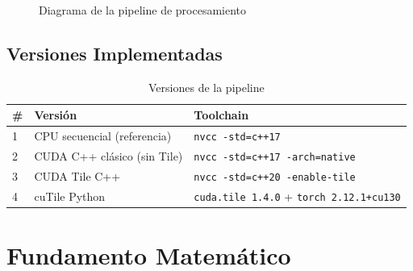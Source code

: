 \documentclass[12pt,a4paper]{article}
\begin{document}
\begin{figure}[H]
\centering
{}
\caption{Diagrama de la pipeline de procesamiento}
\end{figure}

\subsection{Versiones Implementadas}

\begin{table}[H]
\centering
\caption{Versiones de la pipeline}
\begin{tabular}{lll}
\toprule
\textbf{\#} & \textbf{Versi\'on} & \textbf{Toolchain} \\
\midrule
1 & CPU secuencial (referencia) & \texttt{nvcc -std=c++17} \\
2 & CUDA C++ cl\'asico (sin Tile) & \texttt{nvcc -std=c++17 -arch=native} \\
3 & CUDA Tile C++ & \texttt{nvcc -std=c++20 -enable-tile} \\
4 & cuTile Python & \texttt{cuda.tile 1.4.0} + \texttt{torch 2.12.1+cu130} \\
\bottomrule
\end{tabular}
\end{table}

\section{Fundamento Matem\'atico}
\end{document}
